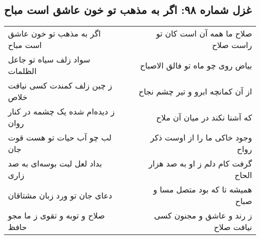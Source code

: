 \begin{center}
\section*{غزل شماره ۹۸: اگر به مذهب تو خون عاشق است مباح}
\label{sec:sh098}
\begin{longtable}{l p{0.5cm} r}
اگر به مذهب تو خون عاشق است مباح
&&
صلاح ما همه آن است کان تو راست صلاح
\\
سواد زلف سیاه تو جاعل الظلمات
&&
بیاض روی چو ماه تو فالق الاصباح
\\
ز چین زلف کمندت کسی نیافت خلاص
&&
از آن کمانچه ابرو و تیر چشم نجاح
\\
ز دیده‌ام شده یک چشمه در کنار روان
&&
که آشنا نکند در میان آن ملاح
\\
لب چو آب حیات تو هست قوت جان
&&
وجود خاکی ما را از اوست ذکر رواح
\\
بداد لعل لبت بوسه‌ای به صد زاری
&&
گرفت کام دلم ز او به صد هزار الحاح
\\
دعای جان تو ورد زبان مشتاقان
&&
همیشه تا که بود متصل مسا و صباح
\\
صلاح و توبه و تقوی ز ما مجو حافظ
&&
ز رند و عاشق و مجنون کسی نیافت صلاح
\\
\end{longtable}
\end{center}
